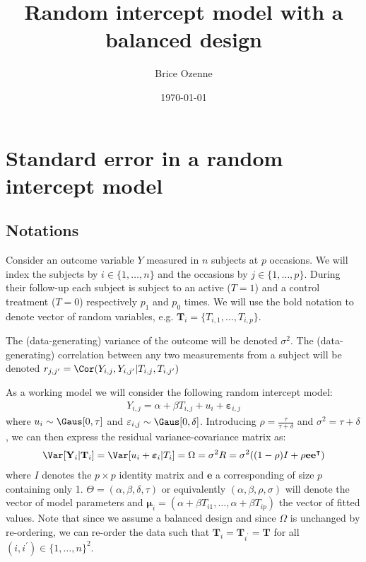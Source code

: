 \documentclass[12pt]{article}
\author{Brice Ozenne}
\date{\today}
\title{Random intercept model with a balanced design}
\newcommand\Ve{\mathbf{e}}
\newcommand\VT{\mathbf{T}}
\newcommand\VY{\mathbf{Y}}
\newcommand\Vvarepsilon{\boldsymbol{\varepsilon}}
\newcommand\Vmu{\boldsymbol{\mu}}
\newcommand\trans[1]{{#1}^\intercal}%
\begin{document}
\maketitle


\section{Standard error in a random intercept model}
\label{sec:org6d4b437}

\subsection{Notations}
\label{sec:org4565cb5}

Consider an outcome variable \(Y\) measured in \(n\) subjects at \(p\)
occasions. We will index the subjects by \(i \in \{1,\ldots,n\}\) and
the occasions by \(j \in \{1,\ldots,p\}\). During their follow-up each
subject is subject to an active (\(T=1\)) and a control treatment
(\(T=0\)) respectively \(p_1\) and \(p_0\) times. We will use the bold
notation to denote vector of random variables, e.g.
\(\VT_i=\{T_{i,1},\ldots,T_{i,p}\}\).

\bigskip

The (data-generating) variance of the outcome will be denoted
\(\sigma^2\). The (data-generating) correlation between any two
measurements from a subject will be denoted \(r_{j,j^{\prime}} = \Cor(Y_{i,j},Y_{i,j^{\prime}}|T_{i,j},T_{i,j^{\prime}})\)

\bigskip

As a working model we will consider the following random intercept
model:
\begin{align*}
Y_{i,j} = \alpha + \beta T_{i,j} + u_i + \Vvarepsilon_{i,j}
\end{align*}
where \(u_i \sim \Gaus[0,\tau]\) and \(\varepsilon_{i,j} \sim
\Gaus[0,\delta]\). Introducing \(\rho = \frac{\tau}{\tau+\delta}\) and
\(\sigma^2=\tau+\delta\), we can then express the residual
variance-covariance matrix as:
\begin{align*}
\Var[\VY_{i}|\VT_i] = \Var[u_{i} + \Vvarepsilon_{i}|T_i] = \Omega = \sigma^2 R = \sigma^2 ((1-\rho) I + \rho \Ve\trans{\Ve})
\end{align*}
where \(I\) denotes the \(p \times p\) identity matrix and \(\Ve\) a
corresponding of size \(p\) containing only 1. \(\Theta =
(\alpha,\beta,\delta,\tau)\) or equivalently
\((\alpha,\beta,\rho,\sigma)\) will denote the vector of model
parameters and \(\Vmu_{i}=\left(\alpha+\beta
T_{i1},\ldots,\alpha+\beta T_{ip}\right)\) the vector of fitted
values. Note that since we assume a balanced design and since
\(\Omega\) is unchanged by re-ordering, we can re-order the data such
that \(\VT_i=\VT_{i^{\prime}}=\VT\) for all \((i,i^{\prime})\in\{1,\ldots,n\}^2\).
\end{document}
